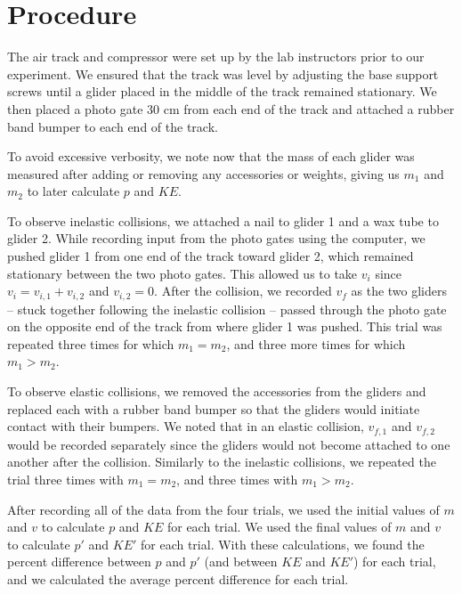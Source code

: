 \section*{Procedure}

The air track and compressor were set up by the lab instructors prior to our experiment. We ensured that the track was level by adjusting the base support screws until a glider placed in the middle of the track remained stationary. We then placed a photo gate 30 cm from each end of the track and attached a rubber band bumper to each end of the track.

\bigskip

To avoid excessive verbosity, we note now that the mass of each glider was measured after adding or removing any accessories or weights, giving us $m_1$ and $m_2$ to later calculate $p$ and $KE$.

\bigskip

To observe inelastic collisions, we attached a nail to glider 1 and a wax tube to glider 2. While recording input from the photo gates using the computer, we pushed glider 1 from one end of the track toward glider 2, which remained stationary between the two photo gates. This allowed us to take $v_i$ since $v_i = v_{i, 1} + v_{i, 2}$ and $v_{i, 2} = 0$. After the collision, we recorded $v_f$ as the two gliders -- stuck together following the inelastic collision -- passed through the photo gate on the opposite end of the track from where glider 1 was pushed. This trial was repeated three times for which $m_1 = m_2$, and three more times for which $m_1 > m_2$.

\bigskip

To observe elastic collisions, we removed the accessories from the gliders and replaced each with a rubber band bumper so that the gliders would initiate contact with their bumpers. We noted that in an elastic collision, $v_{f, 1}$ and $v_{f, 2}$ would be recorded separately since the gliders would not become attached to one another after the collision. Similarly to the inelastic collisions, we repeated the trial three times with $m_1 = m_2$, and three times with $m_1 > m_2$.

\bigskip

After recording all of the data from the four trials, we used the initial values of $m$ and $v$ to calculate $p$ and $KE$ for each trial. We used the final values of $m$ and $v$ to calculate $p'$ and $KE'$ for each trial. With these calculations, we found the percent difference between $p$ and $p'$ (and between $KE$ and $KE'$) for each trial, and we calculated the average percent difference for each trial.
